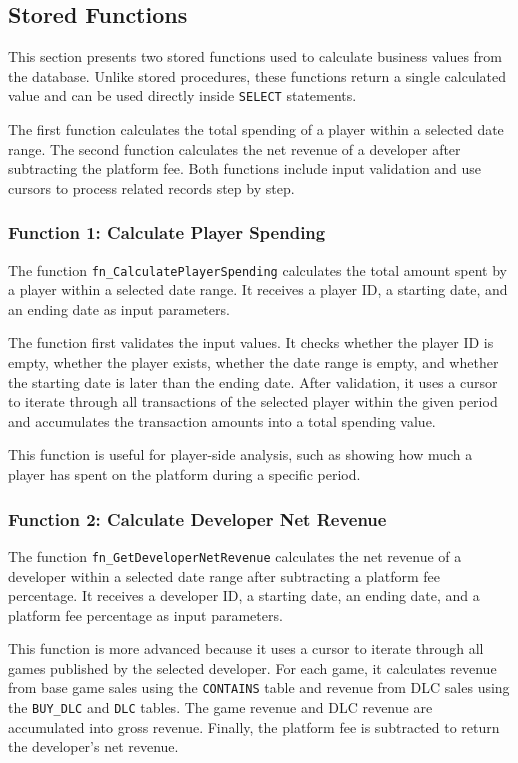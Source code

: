 \subsection{Stored Functions}

This section presents two stored functions used to calculate business values from the database. 
Unlike stored procedures, these functions return a single calculated value and can be used directly inside \texttt{SELECT} statements.

The first function calculates the total spending of a player within a selected date range. 
The second function calculates the net revenue of a developer after subtracting the platform fee. 
Both functions include input validation and use cursors to process related records step by step.
\subsubsection{Function 1: Calculate Player Spending}

The function \texttt{fn\_CalculatePlayerSpending} calculates the total amount spent by a player within a selected date range. 
It receives a player ID, a starting date, and an ending date as input parameters.

The function first validates the input values. 
It checks whether the player ID is empty, whether the player exists, whether the date range is empty, and whether the starting date is later than the ending date. 
After validation, it uses a cursor to iterate through all transactions of the selected player within the given period and accumulates the transaction amounts into a total spending value.

This function is useful for player-side analysis, such as showing how much a player has spent on the platform during a specific period.
\subsubsection{Function 2: Calculate Developer Net Revenue}

The function \texttt{fn\_GetDeveloperNetRevenue} calculates the net revenue of a developer within a selected date range after subtracting a platform fee percentage. 
It receives a developer ID, a starting date, an ending date, and a platform fee percentage as input parameters.

This function is more advanced because it uses a cursor to iterate through all games published by the selected developer. 
For each game, it calculates revenue from base game sales using the \texttt{CONTAINS} table and revenue from DLC sales using the \texttt{BUY\_DLC} and \texttt{DLC} tables. 
The game revenue and DLC revenue are accumulated into gross revenue. 
Finally, the platform fee is subtracted to return the developer's net revenue.

